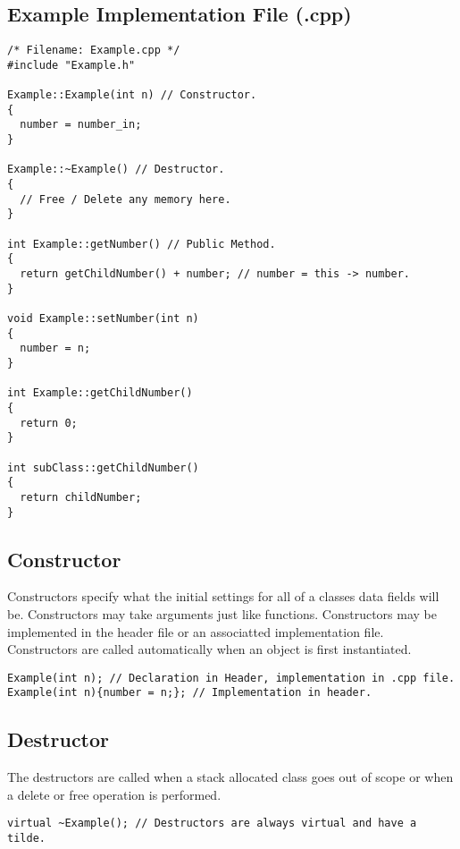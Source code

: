 \documentclass[12pt, letterpaper]{article}
\begin{document}
\newpage

\subsection{Example Implementation File (.cpp)}

\begin{verbatim}
/* Filename: Example.cpp */
#include "Example.h"

Example::Example(int n) // Constructor.
{
  number = number_in;
}

Example::~Example() // Destructor.
{
  // Free / Delete any memory here.
}

int Example::getNumber() // Public Method.
{
  return getChildNumber() + number; // number = this -> number.
}

void Example::setNumber(int n)
{
  number = n;
}

int Example::getChildNumber()
{
  return 0;
}

int subClass::getChildNumber()
{
  return childNumber;
}

\end{verbatim}

\newpage

\subsection{Constructor}

Constructors specify what the initial settings for all of a classes data fields will be. Constructors may take arguments just like functions. Constructors may be implemented in the header file or an associatted implementation file. Constructors are called automatically when an object is first instantiated.

\begin{verbatim}
Example(int n); // Declaration in Header, implementation in .cpp file.
Example(int n){number = n;}; // Implementation in header.
\end{verbatim}

\subsection{Destructor}
The destructors are called when a stack allocated class goes out of scope or when a delete or free operation is performed.
\begin{verbatim}
virtual ~Example(); // Destructors are always virtual and have a tilde.
\end{verbatim}
\end{document}
